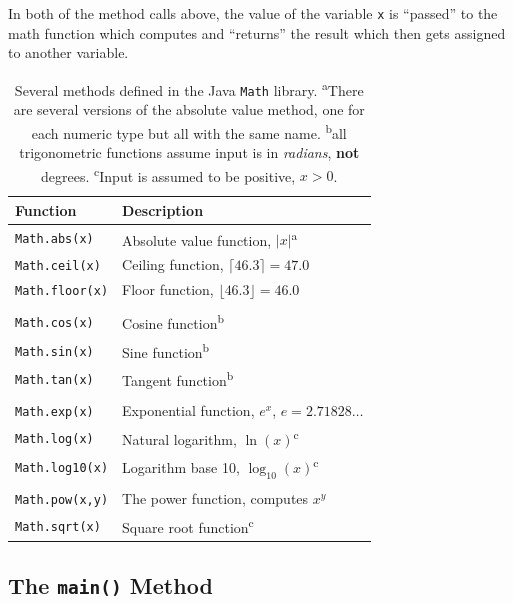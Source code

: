 In both of the method calls above, the value of the variable 
\texttt{x} is ``passed'' to the math function which computes 
and ``returns'' the result which then gets assigned to another variable.

\begin{table}
\centering
\begin{tabular}{l|l}
\hline
Function & Description \\
\hline
\texttt{Math.abs(x)}  & Absolute value function, $|x|$\textsuperscript{a}\\
\texttt{Math.ceil(x)} & Ceiling function, $\lceil 46.3\rceil = 47.0$\\
\texttt{Math.floor(x)} & Floor function, $\lfloor 46.3 \rfloor =46.0$\\
\\
\texttt{Math.cos(x)} & Cosine function\textsuperscript{b}\\
\texttt{Math.sin(x)} & Sine function\textsuperscript{b}\\
\texttt{Math.tan(x)} & Tangent function\textsuperscript{b}\\
\\
\texttt{Math.exp(x)} & Exponential function, $e^x$, $e = 2.71828\ldots$ \\
\texttt{Math.log(x)}  & Natural logarithm, $\ln{(x)}$\textsuperscript{c} \\
\texttt{Math.log10(x)} & Logarithm base 10, $\log_{10}{(x)}$\textsuperscript{c} \\
\\
\texttt{Math.pow(x,y)} & The power function, computes $x^y$\\
\texttt{Math.sqrt(x)} & Square root function\textsuperscript{c}\\

\hline
\end{tabular}
\caption[Several methods defined in the Java \texttt{Math} library]{Several methods defined in the Java \texttt{Math} library.  \textsuperscript{a}There are several versions of the absolute value method, 
one for each numeric type but all with the same name.  \textsuperscript{b}all trigonometric functions assume input is in \emph{radians}, \textbf{not} degrees. \textsuperscript{c}Input is assumed to be positive, $x > 0$.}
\label{table:javaMathFunctions}
\end{table}


\subsection{The \texttt{main()} Method}

